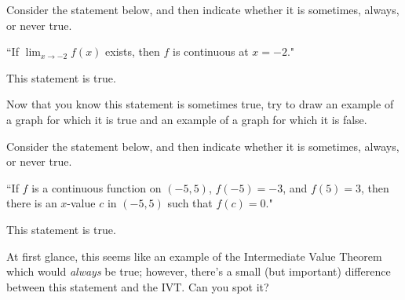 \documentclass[handout]{ximera}
\begin{document}
\begin{exercise}

Consider the statement below, and then indicate whether it is sometimes, always, or never true.

\begin{center} ``If $\displaystyle\lim_{x\to -2} f(x)$ exists, then $f$ is continuous at $x=-2$." \end{center}

This statement is  true.

\begin{feedback}[correct]

Now that you know this statement is sometimes true, try to draw an example of a graph for which it is true and an example of a graph for which it is false.  

\end{feedback}

\end{exercise}

\begin{exercise}

Consider the statement below, and then indicate whether it is sometimes, always, or never true.

\begin{center} ``If $f$ is a continuous function on $(-5, 5)$, $f(-5) = -3$, and $f(5) = 3$, then there is an $x$-value $c$ in $(-5,5)$ such that $f(c) = 0$." \end{center}

This statement is  true.

\begin{feedback}[correct]

At first glance, this seems like an example of the Intermediate Value Theorem which would \textit{always} be true; however, there's a small (but important) difference between this statement and the IVT.  Can you spot it?

\end{feedback}

\end{exercise}
\end{document}
